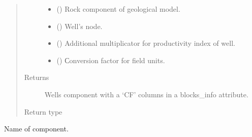 \documentclass[letterpaper,10pt,english]{sphinxmanual}
\begin{document}
\begin{fulllineitems}
\begin{fulllineitems}
\begin{quote}
\begin{description}
\begin{itemize}
\item {} 
 () \textendash{} Rock component of geological model.

\item {} 
 () \textendash{} Well’s node.

\item {} 
 () \textendash{} Additional multiplicator for productivity index of well.

\item {} 
 () \textendash{} Сonversion factor for field units.

\end{itemize}

\item[{Returns}] \leavevmode
{} \textendash{} Wells component with a ‘CF’ columns in a blocks\_info attribute.

\item[{Return type}] \leavevmode
{\hyperref[\detokenize{api/wells:geology.src.wells.Wells}]{}}

\end{description}\end{quote}

\end{fulllineitems}


\begin{fulllineitems}
\label{\detokenize{api/wells:geology.src.wells.Wells.class_name}}
Name of component.

\end{fulllineitems}



\end{fulllineitems}
\end{document}
